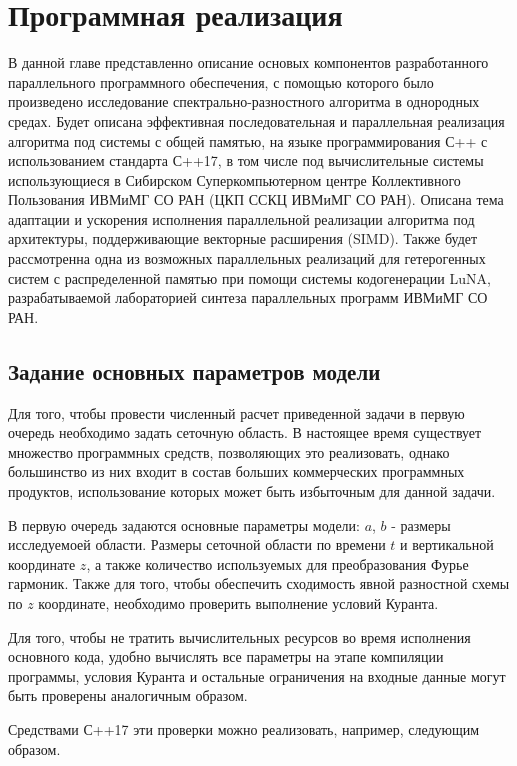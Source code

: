 \section{Программная реализация}

В данной главе представленно описание основых компонентов разработанного параллельного программного обеспечения, 
с помощью которого было произведено исследование спектрально-разностного алгоритма в однородных средах.
Будет описана эффективная последовательная и параллельная реализация алгоритма под системы с общей памятью,
на языке программирования С++ с использованием стандарта С++17, в том числе под вычислительные системы использующиеся в Сибирском Суперкомпьютерном 
центре Коллективного Пользования ИВМиМГ СО РАН (ЦКП ССКЦ ИВМиМГ СО РАН). Описана тема адаптации
и ускорения исполнения параллельной реализации алгоритма под архитектуры, поддерживающие векторные расширения (SIMD).
Также будет рассмотренна одна из возможных параллельных реализаций для гетерогенных систем с распределенной памятью
при помощи системы кодогенерации LuNA, разрабатываемой лабораторией синтеза параллельных программ ИВМиМГ СО РАН.

\subsection{Задание основных параметров модели}

Для того, чтобы провести численный расчет приведенной задачи в первую очередь необходимо задать сеточную область.
В настоящее время существует множество программных средств, позволяющих это реализовать,
однако большинство из них входит в состав больших коммерческих программных продуктов, 
использование которых может быть избыточным для данной задачи.

В первую очередь задаются основные параметры модели: $a$, $b$ - размеры исследуемоей области.
Размеры сеточной области по времени $t$ и вертикальной координате $z$, 
а также количество используемых для преобразования Фурье гармоник. Также для того, чтобы обеспечить
сходимость явной разностной схемы по $z$ координате, необходимо проверить выполнение условий Куранта.

Для того, чтобы не тратить вычислительных ресурсов во время исполнения основного кода, 
удобно вычислять все параметры на этапе компиляции программы, условия Куранта и остальные ограничения на входные данные
могут быть проверены аналогичным образом.

Средствами С++17 эти проверки можно реализовать, например, следующим образом.

